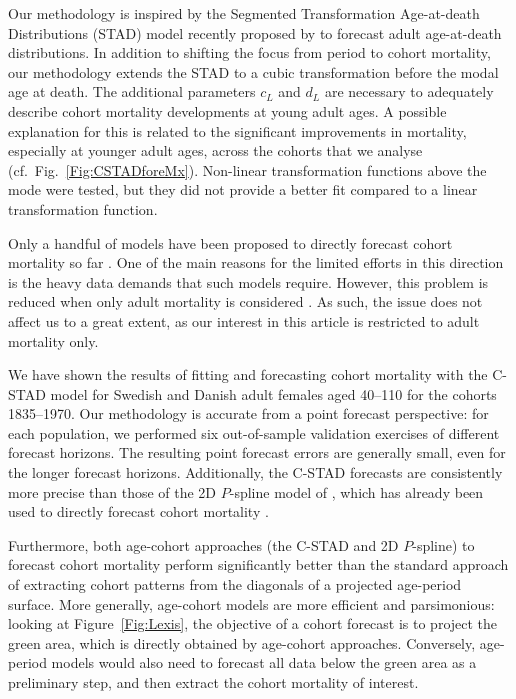 \documentclass[11pt, a4paper]{article}
\begin{document}
Our methodology is inspired by the Segmented Transformation Age-at-death Distributions (STAD) model recently proposed by \cite{basellini2019modelling} to forecast adult age-at-death distributions. In addition to shifting the focus from period to cohort mortality, our methodology extends the STAD to a cubic transformation before the modal age at death. The additional parameters $c_L$ and $d_L$ are necessary to adequately describe cohort mortality developments at young adult ages. A possible explanation for this is related to the significant improvements in mortality, especially at younger adult ages, across the cohorts that we analyse (cf.~Fig.~\ref{Fig:CSTADforeMx}). Non-linear transformation functions above the mode were tested, but they did not provide a better fit compared to a linear transformation function. 

Only a handful of models have been proposed to directly forecast cohort mortality so far \citep{chiou2009modeling,zanotto2017reconstruction,rizzi2019forecasting}. One of the main reasons for the limited efforts in this direction is the heavy data demands that such models require. However, this problem is reduced when only adult mortality is considered \citep{booth2006demographic}. As such, the issue does not affect us to a great extent, as our interest in this article is restricted to adult mortality only. 

We have shown the results of fitting and forecasting cohort mortality with the C-STAD model for Swedish and Danish adult females aged 40--110 for the cohorts 1835--1970. Our methodology is accurate from a point forecast perspective: for each population, we performed six out-of-sample validation exercises of different forecast horizons. The resulting point forecast errors are generally small, even for the longer forecast horizons. Additionally, the C-STAD forecasts are consistently more precise than those of the 2D $P$-spline model of \cite{currie2004smoothing}, which has already been used to directly forecast cohort mortality \citep{cmi2007stochastic}. 

Furthermore, both age-cohort approaches (the C-STAD and 2D $P$-spline) to forecast cohort mortality perform significantly better than the standard approach of extracting cohort patterns from the diagonals of a projected \cite{lee1992modeling} age-period surface. More generally, age-cohort models are more efficient and parsimonious: looking at Figure~\ref{Fig:Lexis}, the objective of a cohort forecast is to project the green area, which is directly obtained by age-cohort approaches. Conversely, age-period models would also need to forecast all data below the green area as a preliminary step, and then extract the cohort mortality of interest.
\end{document}

